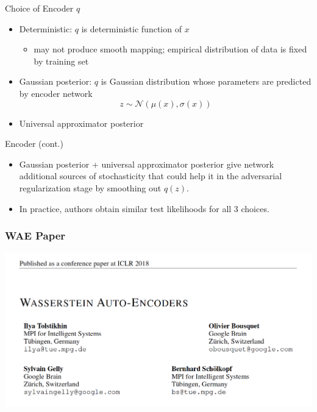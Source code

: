 \documentclass{beamer}
\begin{document}
\begin{frame}{Choice of Encoder $q$}
	\begin{itemize}
		\item Deterministic: $q$ is deterministic function of $x$
		\begin{itemize}
			\item may not produce smooth mapping; empirical distribution of data is fixed by training set
		\end{itemize}
	
		\item Gaussian posterior: $q$ is Gaussian distribution whose parameters are predicted by encoder network
		\[
		z \sim \mathcal{N}(\mu(x), \sigma(x))
		\]
		\item Universal approximator posterior
	\end{itemize}
\end{frame}

\begin{frame}{Encoder (cont.)}
	\begin{itemize}
		\item Gaussian posterior + universal approximator posterior give network additional sources of stochasticity that could help it in the adversarial regularization stage by smoothing out $q(z)$.
		
		\item In practice, authors obtain similar test likelihoods for all 3 choices.
	\end{itemize}
\end{frame}

\begin{frame}
\frametitle{WAE Paper}
\begin{center}
\includegraphics[scale=0.5]{wae-paper}
\end{center}
\end{frame}
\end{document}
